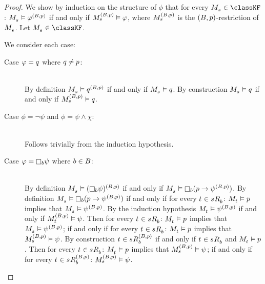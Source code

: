 \begin{proof}
We show by induction on the structure of $\phi$ that for every $\kPModel{\kStateS} \in \classKF$: $\kPModel{\kStateS} \entails \phi^{(\agentsB, \atomP)}$ if and only if $\kPModel[(\agentsB, \atomP)]{\kStateS} \entails \phi$, where $\kPModel[(\agentsB, \atomP)]{\kStateS}$ is the $(B, p)$-restriction of $\kPModel{\kStateS}$.
Let $\kPModel{\kStateS} \in \classKF$.

We consider each case:
\begin{description}
    \item[Case $\varphi = q$ where $q \neq p$:] \hfill\\
        By definition $\kPModel{\kStateS} \entails \atomQ^{(\agentsB, \atomP)}$ if and only if $\kPModel{\kStateS} \entails \atomQ$.
        By construction $\kPModel{\kStateS} \entails \atomQ$ if and only if $\kPModel[(\agentsB, \atomP)]{\kStateS} \entails \atomQ$.
    \item[Case $\phi = \lnot \psi$ and $\phi = \psi \land \chi$:] \hfill\\
        Follows trivially from the induction hypothesis.
    \item[Case $\phi = \necessaryB \psi$ where $b \in B$:] \hfill\\
        By definition $\kPModel{\kStateS} \entails (\necessaryB \psi)^{(\agentsB, \atomP)}$ if and only if $\kPModel{\kStateS} \entails \necessaryB (\atomP \implies \psi^{(\agentsB, \atomP)})$.
        By definition $\kPModel{\kStateS} \entails \necessaryB (\atomP \implies \psi^{(\agentsB, \atomP)})$ if and only if for every $\kStateT \in \kSuccessorsB{\kStateS}$: $\kPModel{\kStateT} \entails \atomP$ implies that  $\kPModel{\kStateS} \entails \psi^{(\agentsB, \atomP)}$.
        By the induction hypothesis $\kPModel{\kStateT} \entails \psi^{(\agentsB, \atomP)}$ if and only if $\kPModel[(\agentsB, \atomP)]{\kStateT} \entails \psi$.
        Then for every $\kStateT \in \kSuccessorsB{\kStateS}$: $\kPModel{\kStateT} \entails \atomP$ implies that  $\kPModel{\kStateS} \entails \psi^{(\agentsB, \atomP)}$; if and only if for every $\kStateT \in \kSuccessorsB{\kStateS}$: $\kPModel{\kStateT} \entails \atomP$ implies that $\kPModel[(\agentsB, \atomP)]{\kStateS} \entails \psi$.
        By construction $\kStateT \in \kSuccessorsB[(\agentsB, \atomP)]{\kStateS}$ if and only if $\kStateT \in \kSuccessorsB{\kStateS}$ and $\kPModel{\kStateT} \entails \atomP$.
        Then for every $\kStateT \in \kSuccessorsB{\kStateS}$: $\kPModel{\kStateT} \entails \atomP$ implies that $\kPModel[(\agentsB, \atomP)]{\kStateS} \entails \psi$; if and only if for every $\kStateT \in \kSuccessorsB[(\agentsB, \atomP)]{\kStateS}$: $\kPModel[(\agentsB, \atomP)]{\kStateS} \entails \psi$.

\end{description}
\end{proof}
